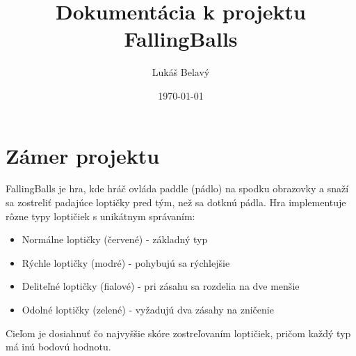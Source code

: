 \documentclass[12pt,a4paper]{article}
\title{Dokumentácia k projektu FallingBalls}
\author{Lukáš Belavý}
\date{\today}
\begin{document}
\maketitle

\section{Zámer projektu}
FallingBalls je hra, kde hráč ovláda paddle (pádlo) na spodku obrazovky a snaží sa zostreliť padajúce loptičky pred tým, než sa dotknú pádla. Hra implementuje rôzne typy loptičiek s unikátnym správaním:
\begin{itemize}
    \item Normálne loptičky (červené) - základný typ
    \item Rýchle loptičky (modré) - pohybujú sa rýchlejšie
    \item Deliteľné loptičky (fialové) - pri zásahu sa rozdelia na dve menšie
    \item Odolné loptičky (zelené) - vyžadujú dva zásahy na zničenie
\end{itemize}

Cieľom je dosiahnuť čo najvyššie skóre zostreľovaním loptičiek, pričom každý typ má inú bodovú hodnotu.
\end{document}
